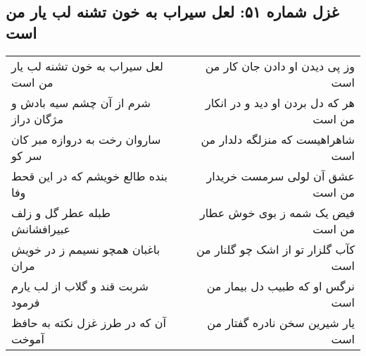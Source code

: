 \begin{center}
\section*{غزل شماره ۵۱: لعل سیراب به خون تشنه لب یار من است}
\label{sec:sh051}
\begin{longtable}{l p{0.5cm} r}
لعل سیراب به خون تشنه لب یار من است
&&
وز پی دیدن او دادن جان کار من است
\\
شرم از آن چشم سیه بادش و مژگان دراز
&&
هر که دل بردن او دید و در انکار من است
\\
ساروان رخت به دروازه مبر کان سر کو
&&
شاهراهیست که منزلگه دلدار من است
\\
بنده طالع خویشم که در این قحط وفا
&&
عشق آن لولی سرمست خریدار من است
\\
طبله عطر گل و زلف عبیرافشانش
&&
فیض یک شمه ز بوی خوش عطار من است
\\
باغبان همچو نسیمم ز در خویش مران
&&
کآب گلزار تو از اشک چو گلنار من است
\\
شربت قند و گلاب از لب یارم فرمود
&&
نرگس او که طبیب دل بیمار من است
\\
آن که در طرز غزل نکته به حافظ آموخت
&&
یار شیرین سخن نادره گفتار من است
\\
\end{longtable}
\end{center}
